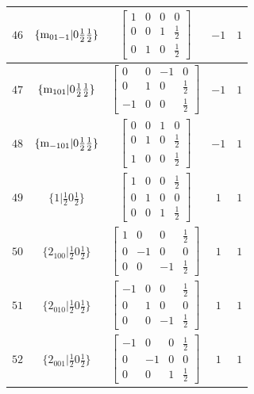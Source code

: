 \documentclass[fleqn,8pt]{jsarticle}
\begin{document}
\begin{longtable}{ccccc}
$ 46 $ & $ \{{\rm m}_{01-1}|0 \frac{1}{2} \frac{1}{2}\} $ & $ \begin{bmatrix} 1 & 0 & 0 & 0 \\ 0 & 0 & 1 & \frac{1}{2} \\ 0 & 1 & 0 & \frac{1}{2} \end{bmatrix} $ & $ -1 $ & $ 1 $ \\ \hline
$ 47 $ & $ \{{\rm m}_{101}|0 \frac{1}{2} \frac{1}{2}\} $ & $ \begin{bmatrix} 0 & 0 & -1 & 0 \\ 0 & 1 & 0 & \frac{1}{2} \\ -1 & 0 & 0 & \frac{1}{2} \end{bmatrix} $ & $ -1 $ & $ 1 $ \\ \hline
$ 48 $ & $ \{{\rm m}_{-101}|0 \frac{1}{2} \frac{1}{2}\} $ & $ \begin{bmatrix} 0 & 0 & 1 & 0 \\ 0 & 1 & 0 & \frac{1}{2} \\ 1 & 0 & 0 & \frac{1}{2} \end{bmatrix} $ & $ -1 $ & $ 1 $ \\ \hline
$ 49 $ & $ \{1|\frac{1}{2} 0 \frac{1}{2}\} $ & $ \begin{bmatrix} 1 & 0 & 0 & \frac{1}{2} \\ 0 & 1 & 0 & 0 \\ 0 & 0 & 1 & \frac{1}{2} \end{bmatrix} $ & $ 1 $ & $ 1 $ \\ \hline
$ 50 $ & $ \{2{}_{100}|\frac{1}{2} 0 \frac{1}{2}\} $ & $ \begin{bmatrix} 1 & 0 & 0 & \frac{1}{2} \\ 0 & -1 & 0 & 0 \\ 0 & 0 & -1 & \frac{1}{2} \end{bmatrix} $ & $ 1 $ & $ 1 $ \\ \hline
$ 51 $ & $ \{2{}_{010}|\frac{1}{2} 0 \frac{1}{2}\} $ & $ \begin{bmatrix} -1 & 0 & 0 & \frac{1}{2} \\ 0 & 1 & 0 & 0 \\ 0 & 0 & -1 & \frac{1}{2} \end{bmatrix} $ & $ 1 $ & $ 1 $ \\ \hline
$ 52 $ & $ \{2{}_{001}|\frac{1}{2} 0 \frac{1}{2}\} $ & $ \begin{bmatrix} -1 & 0 & 0 & \frac{1}{2} \\ 0 & -1 & 0 & 0 \\ 0 & 0 & 1 & \frac{1}{2} \end{bmatrix} $ & $ 1 $ & $ 1 $ \\ \hline

\end{longtable}
\end{document}

